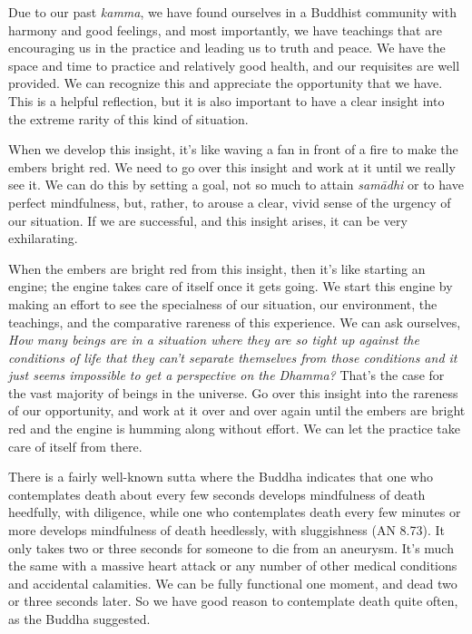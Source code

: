 
Due to our past \emph{kamma}, we have found ourselves in a Buddhist 
community with harmony and good feelings, and most importantly, we have 
teachings that are encouraging us in the practice and leading us to 
truth and peace. We have the space and time to practice and relatively 
good health, and our requisites are well provided. We can recognize 
this and appreciate the opportunity that we have. This is a helpful 
reflection, but it is also important to have a clear insight into the 
extreme rarity of this kind of situation.

When we develop this insight, it's like waving a fan in front of a fire 
to make the embers bright red. We need to go over this insight and work 
at it until we really see it. We can do this by setting a goal, not so 
much to attain \emph{samādhi} or to have perfect mindfulness, but, 
rather, to arouse a clear, vivid sense of the urgency of our situation. 
If we are successful, and this insight arises, it can be very 
exhilarating.

When the embers are bright red from this insight, then it's like 
starting an engine; the engine takes care of itself once it gets going. 
We start this engine by making an effort to see the specialness of our 
situation, our environment, the teachings, and the comparative rareness 
of this experience. We can ask ourselves, \emph{How many beings are in 
a situation where they are so tight up against the conditions of life 
that they can't separate themselves from those conditions and it just 
seems impossible to get a perspective on the Dhamma?} That's the case 
for the vast majority of beings in the universe. Go over this insight 
into the rareness of our opportunity, and work at it over and over 
again until the embers are bright red and the engine is humming along 
without effort. We can let the practice take care of itself from there.


There is a fairly well-known sutta where the Buddha indicates that one 
who contemplates death about every few seconds develops mindfulness of 
death heedfully, with diligence, while one who contemplates death every 
few minutes or more develops mindfulness of death heedlessly, with 
sluggishness (AN 8.73). It only takes two or three seconds for someone 
to die from an aneurysm. It's much the same with a massive heart attack 
or any number of other medical conditions and accidental calamities. We 
can be fully functional one moment, and dead two or three seconds 
later. So we have good reason to contemplate death quite often, as the 
Buddha suggested.


